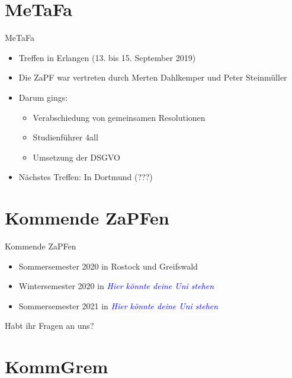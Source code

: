 \documentclass[compress, aspectratio=169]{beamer}
\begin{document}
\section{MeTaFa}

 \begin{frame}{MeTaFa}
  \begin{itemize}
    \item Treffen in Erlangen (13. bis 15. September 2019)
    \item Die ZaPF war vertreten durch Merten Dahlkemper und Peter Steinmüller
    \item Darum gings:
    \begin{itemize}
        \item Verabschiedung von gemeinsamen Resolutionen
        \item Studienführer 4all
        \item Umsetzung der DSGVO
    \end{itemize}
    \item Nächstes Treffen: In Dortmund (???)
   \end{itemize}
 \end{frame}

\section{Kommende ZaPFen}
\begin{frame}{Kommende ZaPFen}
  \begin{itemize}
    \item Sommersemester 2020 in Rostock und Greifswald
    \item Wintersemester 2020 in \textcolor{blue}{\textit{Hier könnte deine Uni stehen}}
    \item Sommersemester 2021 in \textcolor{blue}{\textit{Hier könnte deine Uni stehen}}
    \end{itemize}
\end{frame}

\begin{frame}[plain]
  \begin{center}
    \Huge Habt ihr Fragen an uns?
    \end{center}
\end{frame}

\section{KommGrem}
\end{document}
